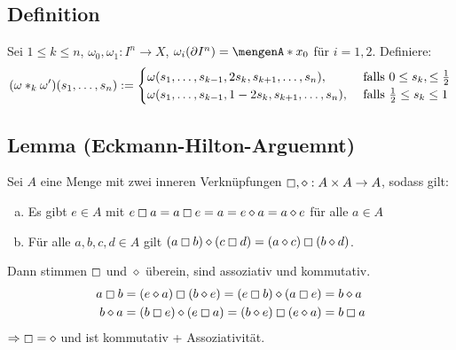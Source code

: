 \subsection{Definition} %
\label{sub:144}
Sei $1 \le k \le n$, $\omega_0, \omega_1 : I^n \to X$, $\omega_i(\partial I^n) = \set{x_0}$ für $i=1,2$. Definiere:
\[
	\enbrace*{\omega *_k \omega'} (s_1, \ldots , s_n) := \begin{cases}
		\omega(s_1, \ldots , s_{k-1}, 2 s_k, s_{k+1}, \ldots , s_n), &\text{ falls } 0 \le s_k, \le \frac{1}{2} \\
		\omega(s_1, \ldots , s_{k-1}, 1- 2 s_k, s_{k+1}, \ldots , s_n), &\text{ falls } \frac{1}{2} \le s_k \le 1 
	\end{cases} 
\]

\subsection{Lemma (Eckmann-Hilton-Arguemnt)} %
\label{sub:145}
Sei $A$ eine Menge mit zwei inneren Verknüpfungen $\boxempty, \diamond : A \times A\to A $, sodass gilt:
\begin{enumerate}[a)]
	\item Es gibt $e \in A$ mit $e \boxempty a = a \boxempty e = a = e \diamond a = a \diamond e$ für alle $a \in A$
	\item Für alle $a,b,c,d \in A$ gilt $(a \boxempty b) \diamond (c \boxempty d) = (a \diamond c) \boxempty (b \diamond d)$.
\end{enumerate}
Dann stimmen $\boxempty$ und $\diamond $ überein, sind assoziativ und kommutativ.
\begin{align*}
	a \boxempty b &= (e \diamond a) \boxempty (b \diamond e) = (e \boxempty b) \diamond (a \boxempty e) = b \diamond a \\
	b \diamond a &= (b \boxempty e) \diamond (e \boxempty a) = (b \diamond e) \boxempty (e \diamond a) = b \boxempty a
\end{align*}
$\Rightarrow \boxempty = \diamond$ und ist kommutativ + Assoziativität. \bewende

